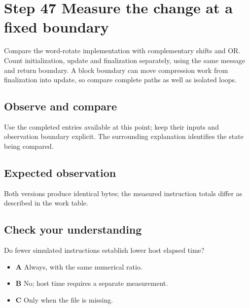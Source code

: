 \section{Step 47 Measure the change at a fixed boundary}\label{sha-s47}

Compare the word-rotate implementation with complementary shifts and OR. Count initialization, update and finalization separately, using the same message and return boundary. A block boundary can move compression work from finalization into update, so compare complete paths as well as isolated loops.

\subsection{Observe and compare}
Use the completed entries available at this point; keep their inputs and observation boundary explicit. The surrounding explanation identifies the state being compared.

\subsection{Expected observation}
Both versions produce identical bytes; the measured instruction totals differ as described in the work table.

\subsection{Check your understanding}
Do fewer simulated instructions establish lower host elapsed time?

\begin{itemize}
\item \textbf{A} Always, with the same numerical ratio.
\item \textbf{B} No; host time requires a separate measurement.
\item \textbf{C} Only when the file is missing.
\end{itemize}
